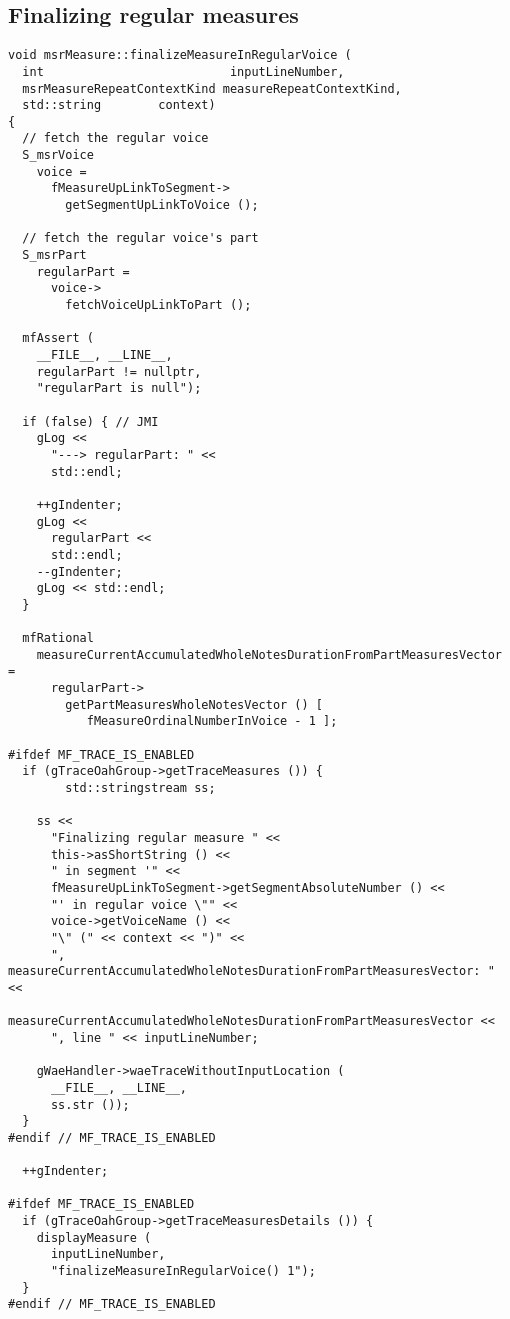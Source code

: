 \subsection{Finalizing regular measures}

\begin{lstlisting}[language=CPlusPlus]
void msrMeasure::finalizeMeasureInRegularVoice (
  int                          inputLineNumber,
  msrMeasureRepeatContextKind measureRepeatContextKind,
  std::string        context)
{
  // fetch the regular voice
  S_msrVoice
    voice =
      fMeasureUpLinkToSegment->
        getSegmentUpLinkToVoice ();

  // fetch the regular voice's part
  S_msrPart
    regularPart =
      voice->
        fetchVoiceUpLinkToPart ();

  mfAssert (
    __FILE__, __LINE__,
    regularPart != nullptr,
    "regularPart is null");

  if (false) { // JMI
    gLog <<
      "---> regularPart: " <<
      std::endl;

    ++gIndenter;
    gLog <<
      regularPart <<
      std::endl;
    --gIndenter;
    gLog << std::endl;
  }

  mfRational
    measureCurrentAccumulatedWholeNotesDurationFromPartMeasuresVector =
      regularPart->
        getPartMeasuresWholeNotesVector () [
           fMeasureOrdinalNumberInVoice - 1 ];

#ifdef MF_TRACE_IS_ENABLED
  if (gTraceOahGroup->getTraceMeasures ()) {
		std::stringstream ss;

    ss <<
      "Finalizing regular measure " <<
      this->asShortString () <<
      " in segment '" <<
      fMeasureUpLinkToSegment->getSegmentAbsoluteNumber () <<
      "' in regular voice \"" <<
      voice->getVoiceName () <<
      "\" (" << context << ")" <<
      ", measureCurrentAccumulatedWholeNotesDurationFromPartMeasuresVector: " <<
      measureCurrentAccumulatedWholeNotesDurationFromPartMeasuresVector <<
      ", line " << inputLineNumber;

    gWaeHandler->waeTraceWithoutInputLocation (
      __FILE__, __LINE__,
      ss.str ());
  }
#endif // MF_TRACE_IS_ENABLED

  ++gIndenter;

#ifdef MF_TRACE_IS_ENABLED
  if (gTraceOahGroup->getTraceMeasuresDetails ()) {
    displayMeasure (
      inputLineNumber,
      "finalizeMeasureInRegularVoice() 1");
  }
#endif // MF_TRACE_IS_ENABLED


\end{lstlisting}
